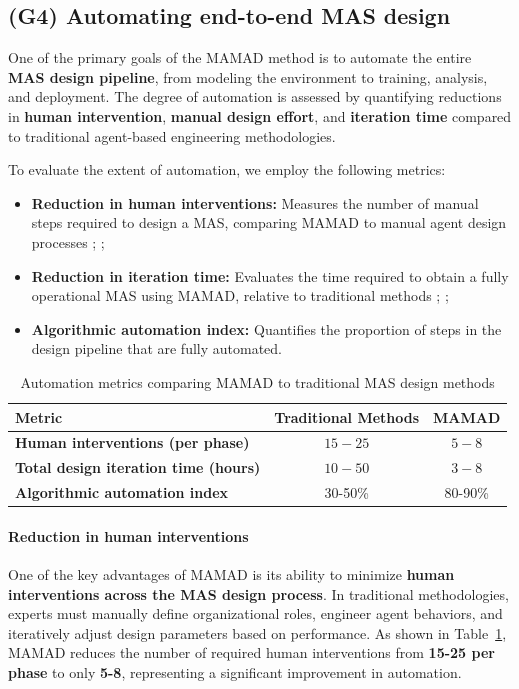 \documentclass[pdflatex,sn-mathphys-num]{sn-jnl}%
\theoremstyle{thmstyleone}%
\theoremstyle{thmstyletwo}%
\theoremstyle{thmstylethree}%
\begin{document}
\subsection{(G4) Automating end-to-end MAS design}

One of the primary goals of the MAMAD method is to automate the entire \textbf{MAS design pipeline}, from modeling the environment to training, analysis, and deployment. The degree of automation is assessed by quantifying reductions in \textbf{human intervention}, \textbf{manual design effort}, and \textbf{iteration time} compared to traditional agent-based engineering methodologies.

To evaluate the extent of automation, we employ the following metrics:

\begin{itemize}
    \item \textbf{Reduction in human interventions:} Measures the number of manual steps required to design a MAS, comparing MAMAD to manual agent design processes ; ;
    \item \textbf{Reduction in iteration time:} Evaluates the time required to obtain a fully operational MAS using MAMAD, relative to traditional methods ; ;
    \item \textbf{Algorithmic automation index:} Quantifies the proportion of steps in the design pipeline that are fully automated.
\end{itemize}

\begin{table}[h!]
    \centering
    \caption{Automation metrics comparing MAMAD to traditional MAS design methods}
    \begin{tabular}{|l|c|c|}
        \hline
        \textbf{Metric} & \textbf{Traditional Methods} & \textbf{MAMAD} \\
        \hline
        \textbf{Human interventions (per phase)} & $15 - 25$ & $5 - 8$ \\
        \hline
        \textbf{Total design iteration time (hours)} & $10 - 50$ & $3 - 8$ \\
        \hline
        \textbf{Algorithmic automation index} & 30-50\% & 80-90\% \\
        \hline
    \end{tabular}
    \label{tab:automation}
\end{table}

\paragraph{Reduction in human interventions}
One of the key advantages of MAMAD is its ability to minimize \textbf{human interventions across the MAS design process}. In traditional methodologies, experts must manually define organizational roles, engineer agent behaviors, and iteratively adjust design parameters based on performance. As shown in Table~\ref{tab:automation}, MAMAD reduces the number of required human interventions from \textbf{15-25 per phase} to only \textbf{5-8}, representing a significant improvement in automation.
\end{document}
